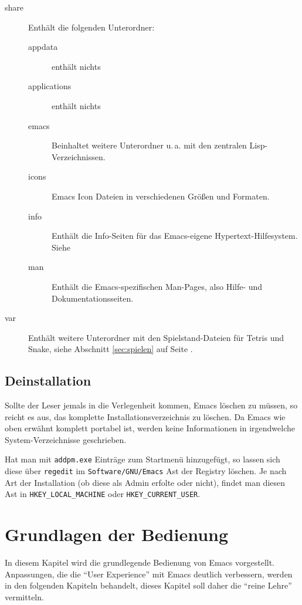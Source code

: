 \documentclass[12pt,ngerman]{scrbook}
\begin{document}
\begin{description}
\item[share] Enthält die folgenden Unterordner:

\begin{description}
\item[appdata] enthält nichts
\item[applications] enthält nichts
\item[emacs] Beinhaltet weitere Unterordner u.\,a. mit den zentralen Lisp-Verzeichnissen.
\item[icons] Emacs Icon Dateien in verschiedenen Größen und Formaten.
\item[info] Enthält die Info-Seiten für das Emacs-eigene Hypertext-Hilfesystem. Siehe 
\item[man] Enthält die Emacs-spezifischen Man-Pages, also Hilfe- und Dokumentationsseiten. 
\end{description}



\item[var] Enthält weitere Unterordner mit den Spielstand-Dateien für Tetris und Snake, siehe Abschnitt \ref{sec:spielen} auf Seite \pageref{sec:spielen}.
\end{description}

\section{Deinstallation}

Sollte der Leser jemals in die Verlegenheit kommen, Emacs löschen zu müssen, so reicht es aus, das komplette Installationsverzeichnis zu löschen. Da Emacs wie oben erwähnt komplett portabel ist, werden keine Informationen in irgendwelche System-Verzeichnisse geschrieben.

Hat man mit \texttt{addpm.exe} Einträge zum Startmenü hinzugefügt, so lassen sich diese über \texttt{regedit} im \texttt{Software/GNU/Emacs} Ast der Registry löschen. 
Je nach Art der Installation (ob diese als Admin erfolte oder nicht), findet man diesen Ast in \verb|HKEY_LOCAL_MACHINE| oder \verb|HKEY_CURRENT_USER|.


\chapter{Grundlagen der Bedienung}

In diesem Kapitel wird die grundlegende Bedienung von Emacs vorgestellt. 
Anpassungen, die die \enquote{User Experience} mit Emacs deutlich verbessern, werden in den folgenden Kapiteln behandelt, dieses Kapitel soll daher die \enquote{reine Lehre} vermitteln.
\end{document}
